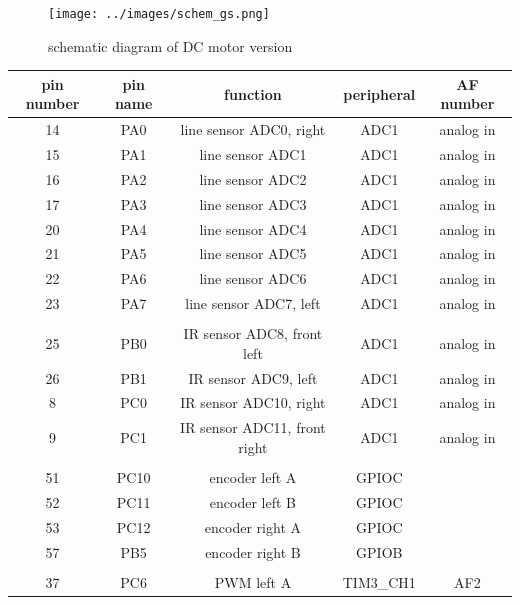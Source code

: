 \documentclass[12pt,twoside,onecolumn,openany,extrafontsizes,dvipsnames]{memoir}
\begin{document}
\newpage
\begin{figure}[h]
    \centering
    \texttt{[image: ../images/schem\_gs.png]}
    \caption{schematic diagram of DC motor version}
\end{figure}

\newpage

    \begin{table}[h!]
        \centering
            \begin{tabular}{||c c c c c||} 
            \hline
            pin number & pin name & function & peripheral & AF number \\
            \hline\hline
                14 & PA0 & line sensor ADC0, right & ADC1 & analog in \\ 
                15 & PA1 & line sensor ADC1 & ADC1 & analog in \\ 
                16 & PA2 & line sensor ADC2 & ADC1 & analog in \\ 
                17 & PA3 & line sensor ADC3 & ADC1 & analog in \\ 
                20 & PA4 & line sensor ADC4 & ADC1 & analog in \\ 
                21 & PA5 & line sensor ADC5 & ADC1 & analog in \\ 
                22 & PA6 & line sensor ADC6 & ADC1 & analog in \\ 
                23 & PA7 & line sensor ADC7, left & ADC1 & analog in \\ 
                & & & & \\
                25 & PB0 & IR sensor ADC8, front left  & ADC1 & analog in \\ 
                26 & PB1 & IR sensor ADC9, left & ADC1 & analog in \\ 
                8 & PC0 & IR sensor ADC10, right & ADC1 & analog in \\ 
                9 & PC1 & IR sensor ADC11, front right & ADC1 & analog in \\ 
                & & & & \\
                51 & PC10 & encoder left A  & GPIOC &  \\ 
                52 & PC11 & encoder left B  & GPIOC &  \\ 
                53 & PC12 & encoder right A  & GPIOC &  \\ 
                57 & PB5  & encoder right B  & GPIOB &  \\ 
                & & & & \\
                37 & PC6 & PWM left A   & TIM3\_CH1 & AF2 \\     

\end{tabular}
\end{table}
\end{document}
